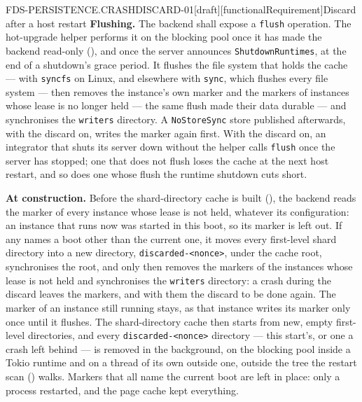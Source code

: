 \begin{requirement}{FDS-PERSISTENCE.CRASHDISCARD-01}[draft][functionalRequirement]{Discard after a host restart}
  \textbf{Flushing.} The backend shall expose a \texttt{flush} operation.
  The hot-upgrade helper performs it on the blocking pool once it has made
  the backend read-only (), and once the
  server announces \texttt{ShutdownRuntimes}, at the end of a shutdown's
  grace period. It flushes the file system that
  holds the cache --- with \texttt{syncfs} on Linux, and elsewhere with
  \texttt{sync}, which flushes every file system --- then removes the instance's own marker and the markers of
  instances whose lease is no longer held --- the same flush made their data
  durable --- and synchronises the \texttt{writers} directory. A
  \texttt{NoStoreSync} store published afterwards, with the discard on,
  writes the marker again first. With the discard on, an integrator that
  shuts its server down without the helper calls \texttt{flush} once the
  server has stopped; one that does not flush loses the cache at the next
  host restart, and so does one whose flush the runtime shutdown cuts
  short.

  \textbf{At construction.} Before the shard-directory cache is built
  (), the backend reads the marker of every
  instance whose lease is not held, whatever its configuration: an instance
  that runs now was started in this boot, so its marker is left out. If any
  names a boot other than the current one, it moves every first-level shard
  directory into a new directory, \texttt{discarded-<nonce>}, under the cache
  root, synchronises the root, and only then removes the markers of the
  instances whose lease is not held and synchronises the \texttt{writers}
  directory: a crash during the discard leaves the markers, and with them
  the discard to be done again. The marker of an instance still running
  stays, as that instance writes its marker only once until it flushes. The
  shard-directory cache then starts from new, empty first-level directories,
  and every \texttt{discarded-<nonce>} directory --- this start's, or one a
  crash left behind --- is removed in the background, on the blocking pool
  inside a Tokio runtime and on a thread of its own outside one, outside the
  tree the restart scan () walks.
  Markers that all name the current boot are left in place: only a process
  restarted, and the page cache kept everything.




\end{requirement}
